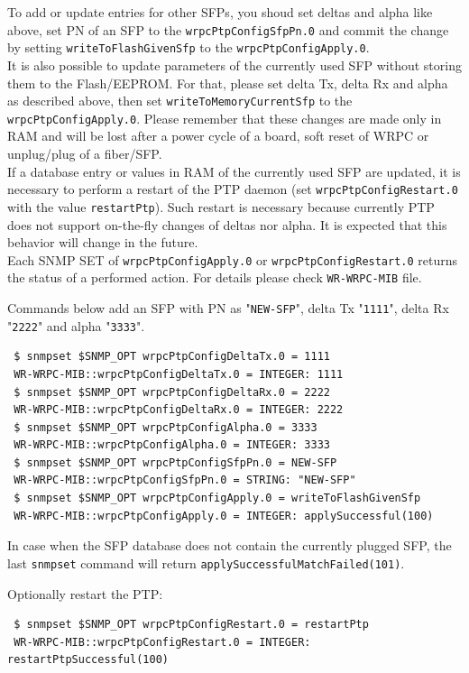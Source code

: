 \documentclass[a4paper, 12pt]{article}
\renewcommand{\_}{\underscore\allowbreak}
\begin{document}
To add or update entries for other SFPs, you shoud set deltas and alpha like
above, set PN of an SFP to the \texttt{wrpcPtpConfigSfpPn.0} and commit
the change by setting \texttt{writeToFlashGivenSfp} to the
\texttt{wrpcPtpConfigApply.0}.\\

It is also possible to update parameters of the currently used SFP without
storing them to the Flash/EEPROM. For that, please set delta Tx, delta Rx and
alpha as described above, then set \texttt{writeToMemoryCurrentSfp} to the
\texttt{wrpcPtpConfigApply.0}. Please remember that these changes are made only
in RAM and will be lost after a power cycle of a board, soft reset of WRPC or
unplug/plug of a fiber/SFP.\\

If a database entry or values in RAM of the currently used SFP are updated, it is
necessary to perform a restart of the PTP daemon
(set \texttt{wrpcPtpConfigRestart.0} with the value \texttt{restartPtp}). Such
restart is necessary because currently PTP does not support on-the-fly changes
of deltas nor alpha. It is expected that this behavior will change in the
future.\\

Each SNMP SET of \texttt{wrpcPtpConfigApply.0} or \texttt{wrpcPtpConfigRestart.0} returns
the status of a performed action. For details please check \texttt{WR-WRPC-MIB}
file.

Commands below add an SFP with PN as "\texttt{NEW-SFP}", delta Tx "\texttt{1111}",
delta Rx "\texttt{2222}" and alpha "\texttt{3333}".
\begin{lstlisting}
 $ snmpset $SNMP_OPT wrpcPtpConfigDeltaTx.0 = 1111
 WR-WRPC-MIB::wrpcPtpConfigDeltaTx.0 = INTEGER: 1111
 $ snmpset $SNMP_OPT wrpcPtpConfigDeltaRx.0 = 2222
 WR-WRPC-MIB::wrpcPtpConfigDeltaRx.0 = INTEGER: 2222
 $ snmpset $SNMP_OPT wrpcPtpConfigAlpha.0 = 3333
 WR-WRPC-MIB::wrpcPtpConfigAlpha.0 = INTEGER: 3333
 $ snmpset $SNMP_OPT wrpcPtpConfigSfpPn.0 = NEW-SFP
 WR-WRPC-MIB::wrpcPtpConfigSfpPn.0 = STRING: "NEW-SFP"
 $ snmpset $SNMP_OPT wrpcPtpConfigApply.0 = writeToFlashGivenSfp
 WR-WRPC-MIB::wrpcPtpConfigApply.0 = INTEGER: applySuccessful(100)
\end{lstlisting}

In case when the SFP database does not contain the currently plugged SFP, the last
\texttt{snmpset} command will return \texttt{applySuccessfulMatchFailed(101)}.

Optionally restart the PTP:
\begin{lstlisting}
 $ snmpset $SNMP_OPT wrpcPtpConfigRestart.0 = restartPtp
 WR-WRPC-MIB::wrpcPtpConfigRestart.0 = INTEGER: restartPtpSuccessful(100)
\end{lstlisting}
\end{document}
